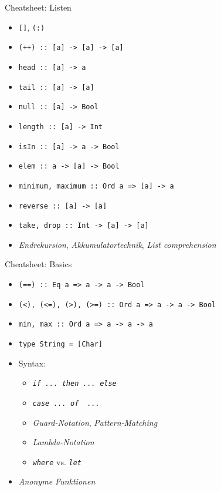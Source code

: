 \documentclass{beamer}
\begin{document}
\begin{frame}{Cheatsheet: Listen}
        \begin{itemize}
          \item \texttt{[]}, \texttt{(:)}
          \item \texttt{(++) :: [a] -> [a] -> [a]}
          \item \texttt{head :: [a] -> a}
          \item \texttt{tail :: [a] -> [a]}
          \item \texttt{null :: [a] -> Bool}
          \item \texttt{length :: [a] -> Int}
          \item \texttt{isIn :: [a] -> a -> Bool}
          \item \texttt{elem :: a -> [a] -> Bool}
          \item \texttt{minimum, maximum :: Ord a => [a] -> a}
          \item \texttt{reverse :: [a] -> [a]}
          \item \texttt{take, drop :: Int -> [a] -> [a]}
          \item \emph{Endrekursion}, \emph{Akkumulatortechnik}, \emph{List comprehension}
        \end{itemize}
\end{frame}

\begin{frame}{Cheatsheet: Basics}
        \begin{itemize}
          \item \texttt{(==) :: Eq a => a -> a -> Bool}
          \item \texttt{(<), (<=), (>), (>=) :: Ord a => a -> a -> Bool}
          \item \texttt{min, max :: Ord a => a -> a -> a}
          \item \texttt{type String = [Char]}
          \item Syntax:
          \begin{itemize}
            \item \emph{\texttt{if ... then ... else}}
            \item \emph{\texttt{case ... of { ... }}}
            \item \emph{Guard-Notation}, \emph{Pattern-Matching}
            \item \emph{Lambda-Notation}
            \item \emph{\texttt{where}} vs. \emph{\texttt{let}}
          \end{itemize}
          \item \emph{Anonyme Funktionen}
        \end{itemize}
\end{frame}
\end{document}
